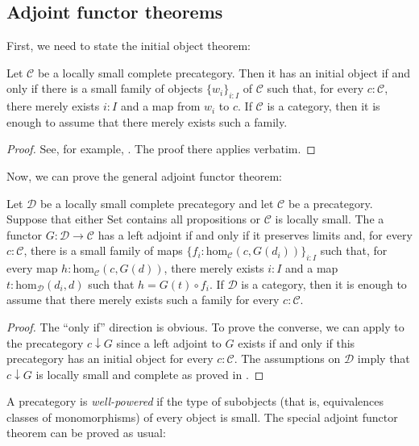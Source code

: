 \documentclass[reqno]{amsart}
\theoremstyle{definition}
\theoremstyle{remark}
\newcommand{\fs}[1]{\mathrm{#1}}
\newcommand{\scat}[1]{\mathcal{#1}}
\renewcommand{\hom}{\fs{hom}}
\newcommand{\uSet}{\fs{Set}}
\numberwithin{figure}{section}
\begin{document}
\subsection{Adjoint functor theorems}

First, we need to state the initial object theorem:

\begin{lem}[initial]
Let $\scat{C}$ be a locally small complete precategory.
Then it has an initial object if and only if there is a small family of objects $\{ w_i \}_{i : I}$ of $\scat{C}$ such that, for every $c : \scat{C}$, there merely exists $i : I$ and a map from $w_i$ to $c$.
If $\scat{C}$ is a category, then it is enough to assume that there merely exists such a family.
\end{lem}
\begin{proof}
See, for example, \cite[Theorem~V.6.1]{maclane}.
The proof there applies verbatim.
\end{proof}

Now, we can prove the general adjoint functor theorem:

\begin{thm}[gaft]
Let $\scat{D}$ be a locally small complete precategory and let $\scat{C}$ be a precategory.
Suppose that either $\uSet$ contains all propositions or $\scat{C}$ is locally small.
The a functor $G : \scat{D} \to \scat{C}$ has a left adjoint if and only if it preserves limits and, for every $c : \scat{C}$, there is a small family of maps $\{ f_i : \hom_\scat{C}(c,G(d_i)) \}_{i : I}$
such that, for every map $h : \hom_\scat{C}(c,G(d))$, there merely exists $i : I$ and a map $t : \hom_\scat{D}(d_i,d)$ such that $h = G(t) \circ f_i$.
If $\scat{D}$ is a category, then it is enough to assume that there merely exists such a family for every $c : \scat{C}$.
\end{thm}
\begin{proof}
The ``only if'' direction is obvious.
To prove the converse, we can apply  to the precategory $c \downarrow G$ since a left adjoint to $G$ exists if and only if this precategory has an initial object for every $c : \scat{C}$.
The assumptions on $\scat{D}$ imply that $c \downarrow G$ is locally small and complete as proved in \cite[Theorem~V.6.2]{maclane}.
\end{proof}

A precategory is \emph{well-powered} if the type of subobjects (that is, equivalences classes of monomorphisms) of every object is small.
The special adjoint functor theorem can be proved as usual:
\end{document}
